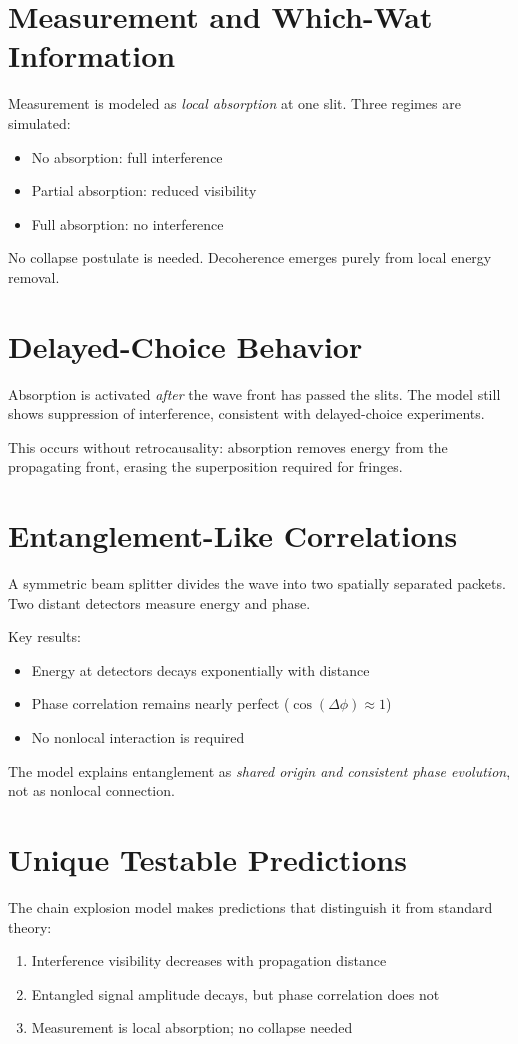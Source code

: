 \documentclass{article}
\begin{document}
\section{Measurement and Which-Wat Information}
Measurement is modeled as \emph{local absorption} at one slit.
Three regimes are simulated:
\begin{itemize}
\item No absorption: full interference
\item Partial absorption: reduced visibility
\item Full absorption: no interference
\end{itemize}

No collapse postulate is needed.
Decoherence emerges purely from local energy removal.

\section{Delayed-Choice Behavior}
Absorption is activated \emph{after} the wave front has passed the slits.
The model still shows suppression of interference,
consistent with delayed-choice experiments.

This occurs without retrocausality:
absorption removes energy from the propagating front,
erasing the superposition required for fringes.

\section{Entanglement-Like Correlations}
A symmetric beam splitter divides the wave into two spatially separated packets.
Two distant detectors measure energy and phase.

Key results:
\begin{itemize}
\item Energy at detectors decays exponentially with distance
\item Phase correlation remains nearly perfect ($\cos(\Delta\phi)\approx 1$)
\item No nonlocal interaction is required
\end{itemize}

The model explains entanglement as \emph{shared origin and consistent phase evolution},
not as nonlocal connection.

\section{Unique Testable Predictions}
The chain explosion model makes predictions that distinguish it from standard theory:
\begin{enumerate}
\item Interference visibility decreases with propagation distance
\item Entangled signal amplitude decays, but phase correlation does not
\item Measurement is local absorption; no collapse needed
\end{enumerate}
\end{document}
